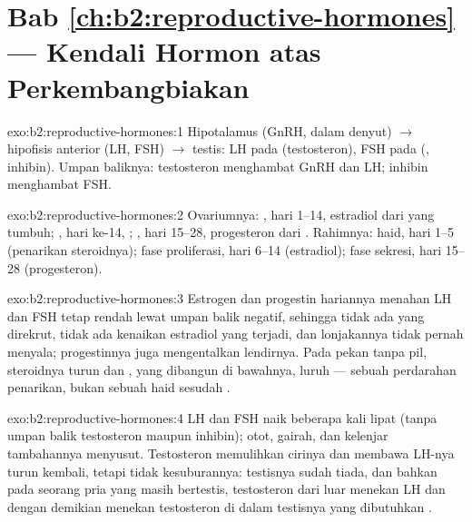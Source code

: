 \section*{Bab \ref{ch:b2:reproductive-hormones} --- Kendali Hormon atas Perkembangbiakan}

\begin{solution}{exo:b2:reproductive-hormones:1}
Hipotalamus (GnRH, dalam denyut) $\to$ hipofisis anterior (LH, FSH)
$\to$ testis: LH pada  (testosteron), FSH pada 
(, inhibin). Umpan baliknya: testosteron menghambat GnRH
dan LH; inhibin menghambat FSH.
\end{solution}

\begin{solution}{exo:b2:reproductive-hormones:2}
Ovariumnya: , hari 1--14, estradiol dari  yang
tumbuh; , hari ke-14, ; , hari 15--28,
progesteron dari . Rahimnya: haid, hari 1--5
(penarikan steroidnya); fase proliferasi, hari 6--14 (estradiol); fase
sekresi, hari 15--28 (progesteron).
\end{solution}

\begin{solution}{exo:b2:reproductive-hormones:3}
Estrogen dan progestin hariannya menahan LH dan FSH tetap rendah lewat
umpan balik negatif, sehingga tidak ada  yang direkrut, tidak
ada kenaikan estradiol yang terjadi, dan lonjakannya tidak pernah
menyala; progestinnya juga mengentalkan lendirnya. Pada pekan tanpa
pil, steroidnya turun dan , yang dibangun di bawahnya,
luruh --- sebuah perdarahan penarikan, bukan sebuah haid sesudah
.
\end{solution}

\begin{solution}{exo:b2:reproductive-hormones:4}
LH dan FSH naik beberapa kali lipat (tanpa umpan balik testosteron
maupun inhibin); otot, gairah, dan kelenjar tambahannya menyusut.
Testosteron memulihkan cirinya dan membawa LH-nya turun kembali, tetapi
tidak kesuburannya: testisnya sudah tiada, dan bahkan pada seorang pria
yang masih bertestis, testosteron dari luar menekan LH dan dengan
demikian menekan testosteron di dalam testisnya yang dibutuhkan
.
\end{solution}

